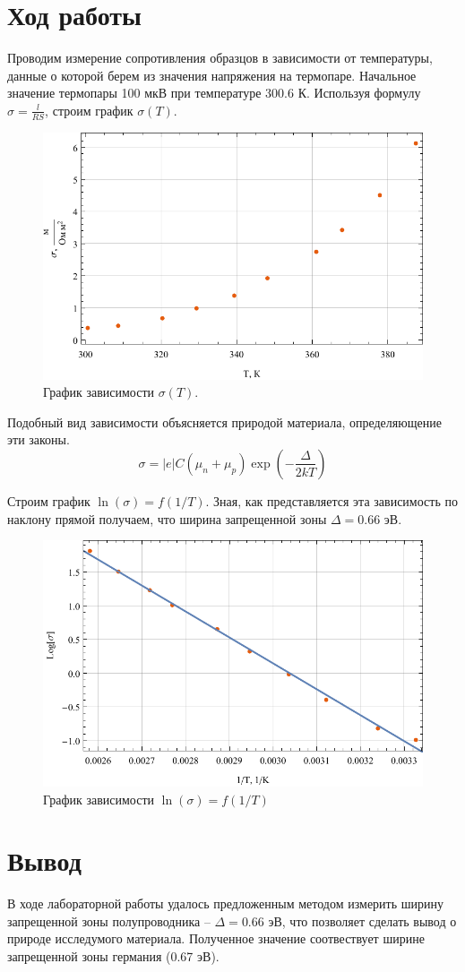 \documentclass[a4paper, 12pt]{article}
\begin{document}
	\section{Ход работы}
	Проводим измерение сопротивления образцов в зависимости от температуры, данные о которой берем из значения напряжения на термопаре. Начальное значение термопары 100 мкВ при температуре 300.6 К. Используя формулу $\sigma=\frac{l}{RS}$, строим график $\sigma(T)$.
	\begin{figure}[!htb]
		\centering
		\includegraphics[scale=1]{graph1.pdf}
		\caption{График зависимости $\sigma(T)$.}
	\end{figure}

	Подобный вид зависимости объясняется природой материала, определяющение эти законы.
	\begin{equation}
		\sigma=|e|C(\mu_n+\mu_p)\exp{\left(-\frac{\Delta}{2kT}\right)}
	\end{equation}

	Строим график $\ln(\sigma)=f(1/T)$. Зная, как представляется эта зависимость по наклону прямой получаем, что ширина запрещенной зоны $\Delta=0.66$ эВ. 
	\begin{figure}[!htb]
		\centering
		\includegraphics[scale=1]{graph2.pdf}
		\caption{График зависимости $\ln(\sigma)=f(1/T)$}
	\end{figure}

	\section{Вывод}
	В ходе лабораторной работы удалось предложенным методом измерить ширину запрещенной зоны полупроводника -- $\Delta=0.66$ эВ, что позволяет сделать вывод о природе исследумого материала. Полученное значение соотвествует ширине запрещенной зоны германия (0.67 эВ).
\end{document}
